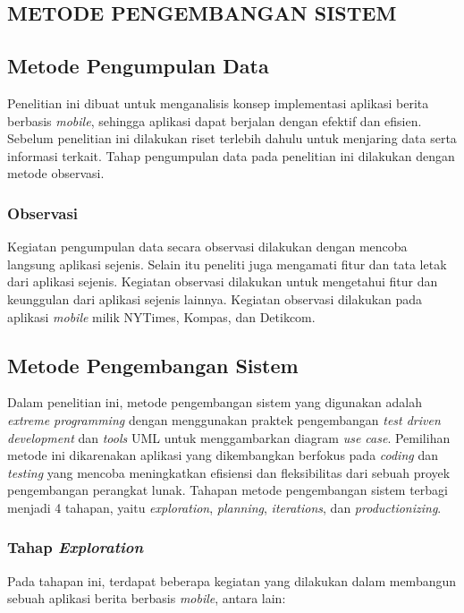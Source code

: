 \begin{spacing}{2}
\chapter{METODE PENGEMBANGAN SISTEM}

\section{Metode Pengumpulan Data}
	Penelitian ini dibuat untuk menganalisis konsep implementasi aplikasi berita berbasis \emph{mobile}, sehingga aplikasi dapat berjalan dengan efektif dan efisien. Sebelum penelitian ini dilakukan riset terlebih dahulu untuk menjaring data serta informasi terkait. Tahap pengumpulan data pada penelitian ini dilakukan dengan metode observasi.

	\subsection{Observasi}
		Kegiatan pengumpulan data secara observasi dilakukan dengan mencoba langsung aplikasi sejenis. Selain itu peneliti juga mengamati fitur dan tata letak dari aplikasi sejenis. Kegiatan observasi dilakukan untuk mengetahui fitur dan keunggulan dari aplikasi sejenis lainnya. Kegiatan observasi dilakukan pada aplikasi \emph{mobile} milik NYTimes, Kompas, dan Detikcom.

\section{Metode Pengembangan Sistem}
  Dalam penelitian ini, metode pengembangan sistem yang digunakan adalah \emph{extreme programming} dengan menggunakan praktek pengembangan \emph{test driven development} dan \emph{tools} UML untuk menggambarkan diagram \emph{use case}. Pemilihan metode ini dikarenakan aplikasi yang dikembangkan berfokus pada \emph{coding} dan \emph{testing} yang mencoba meningkatkan efisiensi dan fleksibilitas dari sebuah proyek pengembangan perangkat lunak. Tahapan metode pengembangan sistem terbagi menjadi 4 tahapan, yaitu \emph{exploration}, \emph{planning}, \emph{iterations}, dan \emph{productionizing}.

  \subsection{Tahap \emph{Exploration}}
    Pada tahapan ini, terdapat beberapa kegiatan yang dilakukan dalam membangun sebuah aplikasi berita berbasis \emph{mobile}, antara lain:


\end{spacing}
